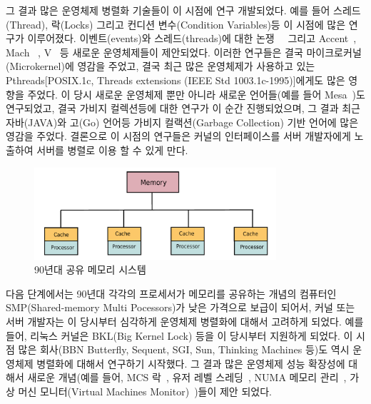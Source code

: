 그 결과 많은 운영체제 병렬화 기술들이 이 시점에 연구 개발되었다. 
예를 들어 스레드(Thread), 락(Locks) 그리고 컨디션 변수(Condition Variables)등 이 시점에 많은 연구가 
이루어졌다.
이벤트(events)와 스레드(threads)에 대한 논쟁~\cite{Ous96}~\cite{vonBehren2003WEB} 그리고
Accent~\cite{Rashid1981ACO}, Mach~\cite{Accetta86mach} , V~\cite{Cheriton1983DVK} 등 새로운 
운영체제들이 제안되었다. 
이러한 연구들은 결국 마이크로커널(Microkernel)에 영감을 주었고, 결국 최근 많은 운영체제가 사용하고 있는 
Pthreads[POSIX.1c, Threads extensions (IEEE Std 1003.1c-1995)]에게도 많은 영향을 주었다. 
이 당시 새로운 운영체제 뿐만 아니라 새로운 언어들(예를 들어 Mesa~\cite{Lampson1979EPM})도 
연구되었고, 결국 가비지 컬렉션등에 대한 연구가 이 순간 진행되었으며, 그 결과 
최근 자바(JAVA)와 고(Go) 언어등 가비지 컬랙션(Garbage Collection) 기반 언어에 많은 영감을 주었다.
결론으로 이 시점의 연구들은 커널의 인터페이스를 서버 개발자에게 노출하여 서버를 
병렬로 이용 할 수 있게 만다.

\begin{figure}[h!]
    \centering
    \includegraphics[width=0.8\textwidth]{fig/shared_memory}
    \caption{90년대 공유 메모리 시스템}
  \label{shared_memory}
\end{figure}

다음 단계에서는 90년대 각각의 프로세서가 메모리를 공유하는 개념의 컴퓨터인 SMP(Shared-memory Multi
Pocessors)가 낮은 가격으로 보급이 되어서, 커널 또는 서버 개발자는 이 당시부터 심각하게 
운영체제 병렬화에 대해서 고려하게 되었다.
예를 들어, 리눅스 커널은 BKL(Big Kernel Lock) 등을 이 당시부터 지원하게 되었다.
이 시점 많은 회사(BBN Butterfly, Sequent, SGI, Sun, Thinking Machines 등)도 역시 운영체제 병렬화에
대해서 연구하기 시작했다.
그 결과 많은 운영체제 성능 확장성에 대해서 새로운 개념(예를 들어, 
MCS 락~\cite{MellorCrummey1991MCS}, 유저 레벨 스레딩~\cite{Marsh1991FUT}, NUMA 메모리
관리~\cite{Bolosky1991NPR}, 가상 머신 모니터(Virtual Machines
Monitor)~\cite{Bugnion1997DRC})들이 제안 되었다.  

